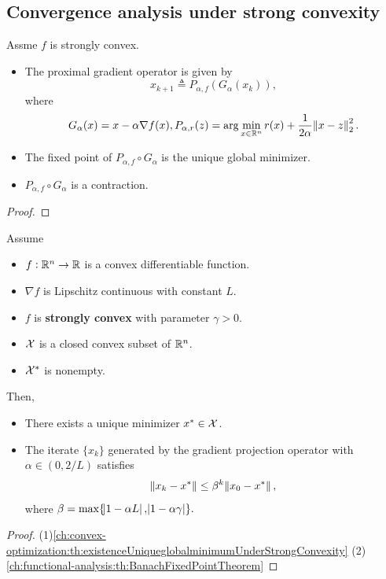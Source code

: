 \begin{refsection}
\subsection{Convergence analysis under strong convexity}

\begin{lemma}
Assme $f$ is strongly convex. 
\begin{itemize}
	\item The proximal gradient operator is given by
	$$x_{k+1} \triangleq P_{\alpha,f}(G_\alpha(x_k)),$$
	where $$G_\alpha (x) = x - \alpha \nabla f(x), P_{\alpha,r}(z) = \arg\min_{x\in \mathbb{R}^n} r(x) + \frac{1}{2\alpha}\norm{x-z}_2^2.$$
	\item The fixed point of $P_{\alpha,f}\circ G_\alpha$ is the unique global minimizer.
	\item $P_{\alpha,f}\circ G_\alpha$ is a contraction.
\end{itemize}
\end{lemma}
\begin{proof}
	
\end{proof}


\begin{lemma}
	Assume
	\begin{itemize}
		\item $f:\mathbb{R}^n\to \mathbb{R}$ is a convex differentiable function.
		\item $\nabla f$ is Lipschitz continuous with constant $L$.
		\item $f$ is \textbf{strongly convex} with parameter $\gamma > 0$.
		\item $\mathcal{X}$ is a closed convex subset of $\mathbb{R}^n$.
		\item $\mathcal{X}^*$ is nonempty.
	\end{itemize}	
	Then,
	\begin{itemize}
		\item There exists a unique minimizer $x^*\in\mathcal{X}$.
		\item The iterate $\{x_k\}$ generated by the gradient projection operator with $\alpha\in (0,2/L)$ satisfies
		$$\norm{x_k - x^*} \leq \beta^k \norm{x_0 - x^*},$$
		where $\beta= \max\{\abs{1-\alpha L},\abs{1-\alpha \gamma}\}.$
	\end{itemize}
\end{lemma}
\begin{proof}
	(1)\autoref{ch:convex-optimization:th:existenceUniqueglobalminimumUnderStrongConvexity}
	(2)\autoref{ch:functional-analysis:th:BanachFixedPointTheorem}
\end{proof}




\end{refsection}
